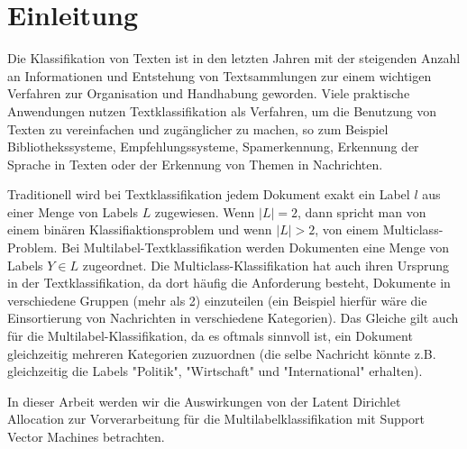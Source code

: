 \section{Einleitung}

\begin{comment}
Einführung und Einbettung des Problems
Was ist die konkrete Problemstellung / Fragestellung der Arbeit
Literature Review
\end{comment}

Die Klassifikation von Texten ist in den letzten Jahren mit der steigenden Anzahl an Informationen und Entstehung von Textsammlungen zur einem wichtigen Verfahren zur Organisation und Handhabung geworden.
Viele praktische Anwendungen nutzen Textklassifikation als Verfahren, um die Benutzung von Texten zu vereinfachen und zugänglicher zu machen, so zum Beispiel Bibliothekssysteme, Empfehlungssysteme, Spamerkennung, Erkennung der Sprache in Texten oder der Erkennung von Themen in Nachrichten.

Traditionell wird bei Textklassifikation jedem Dokument exakt ein Label $l$ aus einer Menge von Labels $L$ zugewiesen.
Wenn $|L| = 2$, dann spricht man von einem binären Klassifiaktionsproblem und wenn $|L| > 2$, von einem Multiclass-Problem.
Bei Multilabel-Textklassifikation werden Dokumenten eine Menge von Labels $Y \in L$ zugeordnet.
Die Multiclass-Klassifikation hat auch ihren Ursprung in der Textklassifikation, da dort häufig die Anforderung besteht, Dokumente in verschiedene Gruppen (mehr als 2) einzuteilen (ein Beispiel hierfür wäre die Einsortierung von Nachrichten in verschiedene Kategorien).
Das Gleiche gilt auch für die Multilabel-Klassifikation, da es oftmals sinnvoll ist, ein Dokument gleichzeitig mehreren Kategorien zuzuordnen (die selbe Nachricht könnte z.B. gleichzeitig die Labels "Politik", "Wirtschaft" und "International" erhalten).

In dieser Arbeit werden wir die Auswirkungen von der Latent Dirichlet Allocation zur Vorverarbeitung für die Multilabelklassifikation mit Support Vector Machines betrachten.


